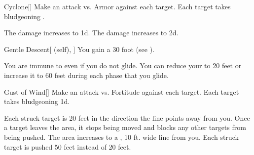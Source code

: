 \lowercase{\hypertarget{spell:Cyclone}{}}\label{spell:Cyclone}
\begin{freeability}[Rank 3]{\hypertarget{spell:Cyclone}{Cyclone}}[]
Make an attack vs. Armor against each target.
\hit Each target takes bludgeoning .

\rankline
{} The damage increases to  \plus1d.
 The damage increases to  \plus2d.
\end{freeability}
\vspace{0.25em}



\lowercase{\hypertarget{spell:Gentle Descent}{}}\label{spell:Gentle Descent}
\begin{attuneability}[Rank 3]{\hypertarget{spell:Gentle Descent}{Gentle Descent}}[ (self), ]
You gain a 30 foot  (see ).

\rankline
{} You are immune to  even if you do not glide.
 You can reduce your  to 20 feet or increase it to 60 feet during each phase that you glide.
\end{attuneability}
\vspace{0.25em}



\lowercase{\hypertarget{spell:Gust of Wind}{}}\label{spell:Gust of Wind}
\begin{freeability}[Rank 3]{\hypertarget{spell:Gust of Wind}{Gust of Wind}}[]
Make an attack vs. Fortitude against each target.
\hit Each target takes bludgeoning  \minus1d.

\rankline
 Each struck target is  20 feet in the direction the line points away from you.
Once a target leaves the area, it stops being moved and blocks any other targets from being pushed.
 The area increases to a \areahuge, 10 ft. wide line from you.
 Each struck target is pushed 50 feet instead of 20 feet.
\end{freeability}
\vspace{0.25em}



